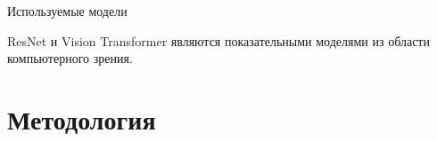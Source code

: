 \documentclass[9pt]{beamer}
\begin{document}
\begin{frame}{Используемые модели}
    \begin{figure}
        \setcounter{subfigure}{0}
        \centering
        \hskip4pt
    \end{figure}

    \begin{block}{}
        ResNet и Vision Transformer являются показательными моделями из области компьютерного зрения.
    \end{block}
\end{frame}

\section{Методология}
\end{document}
